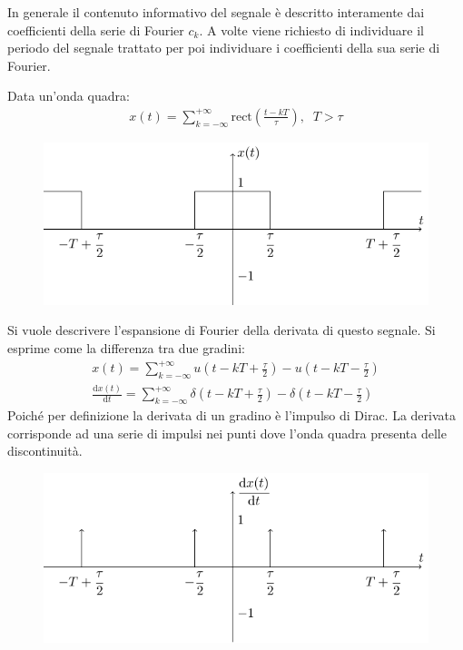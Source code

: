 \documentclass{article}
\newcommand{\rect}{\mathrm{rect}}
\newcommand{\df}{\mathrm{d}}
\numberwithin{equation}{subsection}
\begin{document}
In generale il contenuto informativo del segnale è descritto interamente dai coefficienti della serie di Fourier $c_k$. 
A volte viene richiesto di individuare il periodo del segnale trattato per poi individuare i coefficienti della sua serie di Fourier.




Data un'onda quadra: 
\begin{gather*}
    x(t)=\displaystyle\sum_{k=-\infty}^{+\infty}\rect{\left(\frac{t-kT}{\tau}\right)},\;\; T>\tau
\end{gather*}

\begin{figure}[H]%
    \centering
    \includegraphics{onda-quadra-3.pdf}%
\end{figure}

Si vuole descrivere l'espansione  di Fourier della derivata di questo segnale. Si esprime come la differenza tra due gradini:
\begin{gather*}
    x(t)=\displaystyle\sum_{k=-\infty}^{+\infty}u\left(t-kT+\frac{\tau}{2}\right)-u\left(t-kT-\frac{\tau}{2}\right)\\
    \displaystyle\frac{\df x(t)}{\df t}=\sum_{k=-\infty}^{+\infty}\delta\left(t-kT+\frac{\tau}{2}\right)-\delta\left(t-kT-\frac{\tau}{2}\right)
\end{gather*}
Poiché per definizione la derivata di un gradino è l'impulso di Dirac. La derivata corrisponde ad una serie di impulsi nei punti dove l'onda quadra presenta delle discontinuità. 

\begin{figure}[H]%
    \centering
    \includegraphics{serie-impulsi-1.pdf}%
\end{figure}
\end{document}
